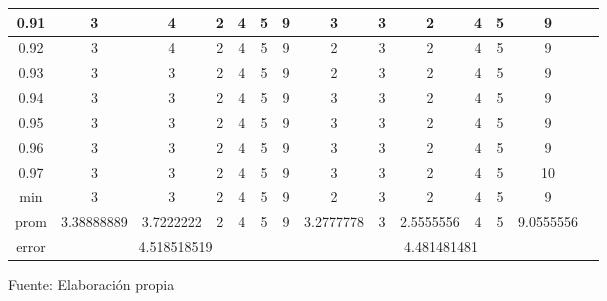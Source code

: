 \begin{center}
\begin{table}[H]
{\begin{tabular}{|c|c|c|c|c|c|c|c|c|c|c|c|c|c|}
\hline 
0.91 & 
3 & 4 & 2 & 4 & 5 & 9 & 3 & 3 & 2 & 4 & 5 & 9\\
\hline 
0.92 & 
3 & 4 & 2 & 4 & 5 & 9 & 2 & 3 & 2 & 4 & 5 & 9\\
\hline 
0.93 & 
3 & 3 & 2 & 4 & 5 & 9 & 2 & 3 & 2 & 4 & 5 & 9\\
\hline 
0.94 & 
3 & 3 & 2 & 4 & 5 & 9 & 3 & 3 & 2 & 4 & 5 & 9\\
\hline 
0.95 & 
3 & 3 & 2 & 4 & 5 & 9 & 3 & 3 & 2 & 4 & 5 & 9\\
\hline 
0.96 & 
3 & 3 & 2 & 4 & 5 & 9 & 3 & 3 & 2 & 4 & 5 & 9\\
\hline 
0.97 & 
3 & 3 & 2 & 4 & 5 & 9 & 3 & 3 & 2 & 4 & 5 & 10\\
\hline 
min & 
3 & 3 & 2 & 4 & 5 & 9 & 2 & 3 & 2 & 4 & 5 & 9\\
\hline 
prom & 
3.38888889 & 3.7222222 & 2 & 4 & 5 & 9 & 3.2777778 & 3 & 2.5555556 & 4 & 5 & 9.0555556 \\
\hline 
error & 
\multicolumn{6}{c|}{4.518518519} &
\multicolumn{6}{c|}{4.481481481}\\ 
\hline 
\end{tabular} 
}
\begin{center}
\vskip 0.2cm
{\small{Fuente: Elaboración propia}}
\end{center}
\end{table}
\end{center}

